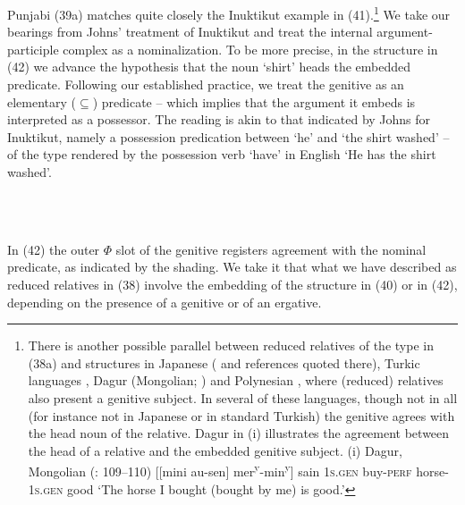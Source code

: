 \documentclass[output=paper]{langsci/langscibook}
\begin{document}
Punjabi (39a) matches quite closely the Inuktikut example in (41).\footnote{There is another possible parallel between reduced relatives of the type in (38a) and structures in Japanese (\citealt{Miyagawa2011} and references quoted there), Turkic languages \citep{Kornfilt2008}, Dagur (Mongolian; \citealt{Hale2002}) and Polynesian \citep{HerdEtAl2011}, where (reduced) relatives also present a genitive subject. In several of these languages, though not in all (for instance not in Japanese or in standard Turkish) the genitive agrees with the head noun of the relative. Dagur in (i) illustrates the agreement between the head of a relative and the embedded genitive subject. (i)  Dagur, Mongolian (\citealt{Hale2002}: 109–110)   [[mini   au-sen]    mer\textsuperscript{y}{}-min\textsuperscript{y}]   sain  \textsc{1s.gen}  buy-\textsc{perf}  horse-\textsc{1s.gen}  good  ‘The horse I bought (bought by me) is good.’ }  We take our bearings from Johns’ treatment of Inuktikut and treat the internal argument-participle complex as a nominalization. To be more precise, in the structure in (42) we advance the hypothesis that the noun ‘shirt’ heads the embedded predicate. Following our established practice, we treat the genitive as an elementary (${\subseteq}$) predicate – which implies that the argument it embeds is interpreted as a possessor. The reading is akin to that indicated by Johns for Inuktikut, namely a possession predication between ‘he’ and ‘the shirt washed’ – of the type rendered by the possession verb ‘have’ in English ‘He has the shirt washed’.  

\begin{styleSfondomedioiColorexi}
\ea%
    \label{ex:key:42}
    \gll\\
        \\
    \glt
    \z

                   
\end{styleSfondomedioiColorexi}

 
\begin{styleSfondomedioiColorexxi}
In (42) the outer $\Phi $ slot of the genitive registers agreement with the nominal predicate, as indicated by the shading. We take it that what we have described as reduced relatives in (38) involve the embedding of the structure in (40) or in (42), depending on the presence of a genitive or of an ergative. 
\end{styleSfondomedioiColorexxi}
\end{document}
